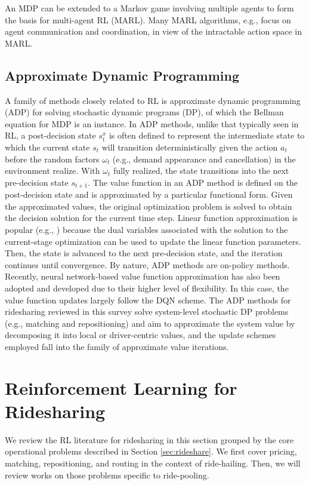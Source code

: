 \documentclass{article}
\begin{document}
An MDP can be extended to a Markov game involving multiple agents to form the basis for multi-agent RL (MARL). Many MARL algorithms, e.g., \cite{yang2018mean,lowe2017multi} focus on agent communication and coordination, in view of the intractable action space in MARL. 

\subsection{Approximate Dynamic Programming}
A family of methods closely related to RL is approximate dynamic programming (ADP) \citep{powell2007approximate} for solving stochastic dynamic programs (DP), of which the Bellman equation for MDP is an instance. In ADP methods, unlike that typically seen in RL, a post-decision state $s_t^x$ is often defined to represent the intermediate state to which the current state $s_t$ will transition deterministically given the action $a_t$ before the random factors $\omega_t$ (e.g., demand appearance and cancellation) in the environment realize. With $\omega_t$ fully realized, the state transitions into the next pre-decision state $s_{t+1}$. The value function in an ADP method is defined on the post-decision state and is approximated by a particular functional form. Given the approximated values, the original optimization problem is solved to obtain the decision solution for the current time step. Linear function approximation is popular (e.g., \citep{simao2009approximate,yu2019integrated,al2020approximate}) because the dual variables associated with the solution to the current-stage optimization can be used to update the linear function parameters. Then, the state is advanced to the next pre-decision state, and the iteration continues until convergence. By nature, ADP methods are on-policy methods. Recently, neural network-based value function approximation \citep{shah2020neural} has also been adopted and developed due to their higher level of flexibility. In this case, the value function updates largely follow the DQN scheme.
The ADP methods for ridesharing reviewed in this survey solve system-level stochastic DP problems (e.g., matching and repositioning) and aim to approximate the system value by decomposing it into local or driver-centric values, and the update schemes employed fall into the family of approximate value iterations.


\section{Reinforcement Learning for Ridesharing}\label{sec:survey}
We review the RL literature for ridesharing in this section grouped by the core operational problems described in Section \ref{sec:rideshare}. We first cover pricing, matching, repositioning, and routing in the context of ride-hailing. Then, we will review works on those problems specific to ride-pooling. 
\end{document}
